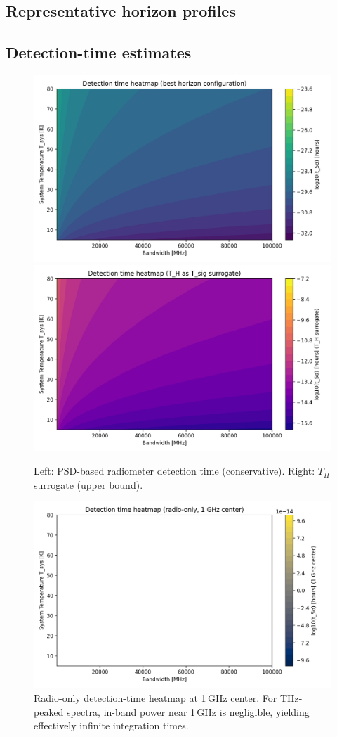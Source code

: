 \documentclass[11pt]{article}
\begin{document}
\subsection{Representative horizon profiles}

\subsection{Detection-time estimates}
\begin{figure}[h]
  \centering
  \includegraphics[width=0.48\linewidth]{figures/horizon_analysis_detection_time.png}\hfill
  \includegraphics[width=0.48\linewidth]{figures/horizon_analysis_detection_time_TH.png}
  \caption{Left: PSD-based radiometer detection time (conservative). Right: $T_H$ surrogate (upper bound).}
\end{figure}

\begin{figure}[h]
  \centering
  \includegraphics[width=0.7\linewidth]{figures/horizon_analysis_detection_time_radio.png}
  \caption{Radio-only detection-time heatmap at 1\,GHz center. For THz-peaked spectra, in-band power near 1\,GHz is negligible, yielding effectively infinite integration times.}
\end{figure}
\end{document}
